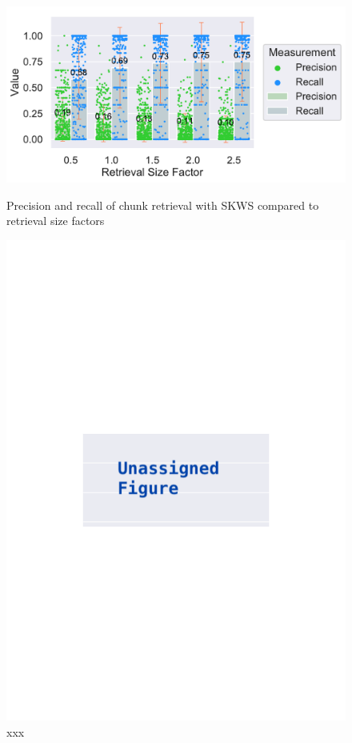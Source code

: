 \documentclass[\myrootdir/main.tex]{subfiles}
\begin{document}
\begin{figure}[htbp]
	\centering
	\begin{minipage}{0.45\textwidth}
		\centering
		\includegraphics[width=\textwidth, clip]{img/big-study/contextsizefactor-precision-recall-SKWS.pdf}
		\caption{Precision and recall of chunk retrieval with SKWS compared to retrieval size factors}
		\label{fig:contextsizefactor-precision-recall-SKWS}
	\end{minipage}\hfill
	\begin{minipage}{0.45\textwidth}
		\centering
		\includegraphics[width=\textwidth, clip]{img/big-study/xxx.pdf}
		\caption{xxx}
		\label{fig:xxx}
	\end{minipage}
\end{figure}
\end{document}
